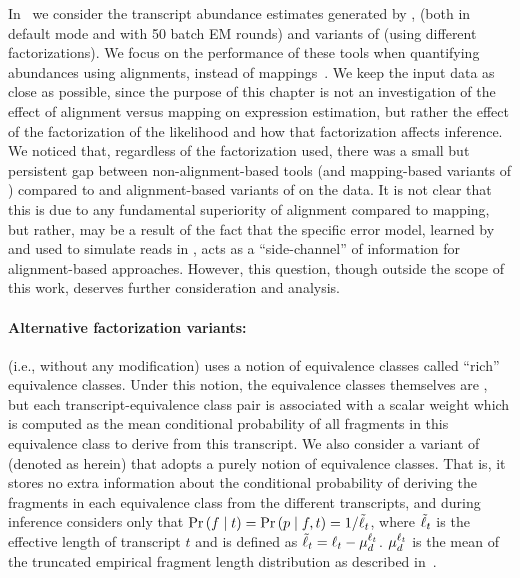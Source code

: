 In~ we consider the transcript
abundance estimates generated by \rsem, \express (both in default mode and with 
50 batch EM rounds) and variants of \salmon (using different factorizations). 
We focus on the performance of these tools when quantifying
abundances using alignments, instead of mappings~\citep{Srivastava2016rapmap}.
We keep the input data as close as possible, since the purpose of this chapter is
not an investigation of the effect of alignment versus mapping on expression
estimation, but rather the effect of the factorization of the likelihood and how
that factorization affects inference. We noticed that, regardless of the
factorization used, there was a small but persistent gap between non-alignment-based
tools (\kallisto and mapping-based variants of \salmon) compared to \rsem and 
alignment-based variants of \salmon on the \rsemsim data. It is not clear that 
this is due to any fundamental superiority of alignment compared to mapping, 
but rather, may be a result of the fact that the specific error model, learned 
by \rsem and used to simulate reads in \rsemsim, acts as a ``side-channel'' of 
information for alignment-based approaches.  However, this question, though 
outside the scope of this work, deserves further consideration and analysis.


\paragraph{Alternative factorization variants:} \salmon (i.e., without any
modification) uses a \cb notion of equivalence classes called ``rich''
equivalence classes. Under this notion, the equivalence classes themselves are
\cb, but each transcript-equivalence class pair is associated with a scalar
weight which is computed as the mean conditional probability of all fragments in
this equivalence class to derive from this transcript. We also consider a
variant of \salmon (denoted as \salmonu herein) that adopts a purely \cb notion
of equivalence classes. That is, it stores no extra information about the
conditional probability of deriving the fragments in each equivalence class from
the different transcripts, and during inference considers only that $\Prob{f}{t}
= \Prob{p}{f,t} = 1 / \elength{t}$, where $\tilde{\ell}_{t}$ is the effective length
of transcript $t$ and is defined as $\tilde{\ell}_{t} = \ell_{t}-
\mu_d^{\ell_{t}}$. $\mu_d^{\ell_{t}}$ is the mean of the truncated empirical
fragment length distribution as described in~\citep{Patro2017Salmon}.

